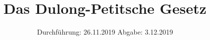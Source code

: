 

\subject{V201}
\title{Das Dulong-Petitsche Gesetz}
\date{%
  Durchführung: 26.11.2019
  \hspace{3em}
  Abgabe: 3.12.2019
}



\maketitle
\thispagestyle{empty}
\tableofcontents
\newpage








\printbibliography{}


